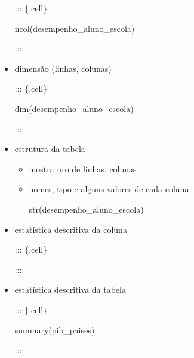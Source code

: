 \documentclass[
  letterpaper,
  DIV=11,
  numbers=noendperiod]{scrreprt}
\newenvironment{Shaded}{\begin{snugshade}}{\end{snugshade}}
\newcommand{\FunctionTok}[1]{\textcolor[rgb]{0.28,0.35,0.67}{#1}}
\newcommand{\NormalTok}[1]{\textcolor[rgb]{0.00,0.23,0.31}{#1}}
\newcommand{\SpecialCharTok}[1]{\textcolor[rgb]{0.37,0.37,0.37}{#1}}
\begin{document}
\begin{itemize}
  ::: \{.cell\}

\begin{Shaded}
\begin{Highlighting}[]
\FunctionTok{ncol}\NormalTok{(desempenho\_aluno\_escola)}
\end{Highlighting}
\end{Shaded}

  :::
\item
  dimensão (linhas, colunas)

  ::: \{.cell\}

\begin{Shaded}
\begin{Highlighting}[]
\FunctionTok{dim}\NormalTok{(desempenho\_aluno\_escola)}
\end{Highlighting}
\end{Shaded}

  :::
\item
  estrutura da tabela

  \begin{itemize}
  \item
    mostra nro de linhas, colunas
  \item
    nomes, tipo e alguns valores de cada coluna

\begin{Shaded}
\begin{Highlighting}[]
\FunctionTok{str}\NormalTok{(desempenho\_aluno\_escola)}
\end{Highlighting}
\end{Shaded}
  \end{itemize}
\item
  estatística descritiva da coluna

  ::: \{.cell\}

\begin{Shaded}
\end{Shaded}

  :::
\item
  estatística descritiva da tabela

  ::: \{.cell\}

\begin{Shaded}
\begin{Highlighting}[]
\FunctionTok{summary}\NormalTok{(pib\_paises)}
\end{Highlighting}
\end{Shaded}

  :::
\end{itemize}
\end{document}
